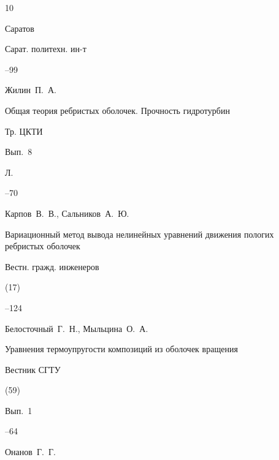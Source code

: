 \begin{thebibliography}{10}

\publaddr Саратов

\publ  Сарат. политехн. ин-т

--99





 










\by Жилин~П.~А.

\paper Общая теория ребристых оболочек. Прочность гидротурбин

\inbook Тр. ЦКТИ


\volinfo Вып.~8

\publaddr Л.

--70








\by Карпов~В.~В., Сальников~А.~Ю.

\paper Вариационный метод вывода нелинейных уравнений движения пологих ребристых оболочек 

\jour Вестн. гражд. инженеров


(17)

--124









\by  Белосточный~Г.~Н., Мыльцина~О.~А.

\paper Уравнения термоупругости композиций из оболочек вращения 

\jour Вестник СГТУ


 (59)

\issueinfo Вып.~1

--64



   


\by  Онанов~Г.~Г.


\end{thebibliography}
